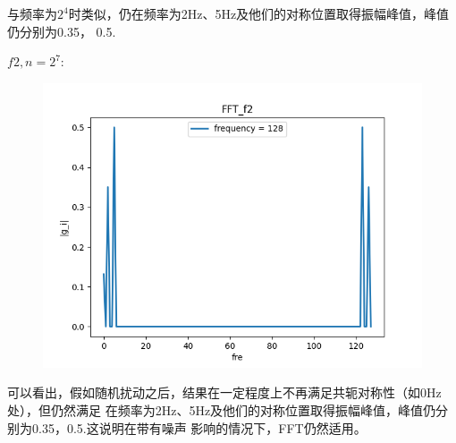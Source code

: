 \documentclass[12pt,a4paper,oneside]{article}
\begin{document}
与频率为$2^4$时类似，仍在频率为2Hz、5Hz及他们的对称位置取得振幅峰值，峰值仍分别为0.35，
0.5.\par
$f2,n = 2^7$:
\begin{figure}[H]
    \centering
    \includegraphics[scale = 0.85]{../res/figs/FFT_f2.png}
\end{figure}
\par
可以看出，假如随机扰动之后，结果在一定程度上不再满足共轭对称性（如0Hz处），但仍然满足
在频率为2Hz、5Hz及他们的对称位置取得振幅峰值，峰值仍分别为0.35，0.5.这说明在带有噪声
影响的情况下，FFT仍然适用。
\end{document}
